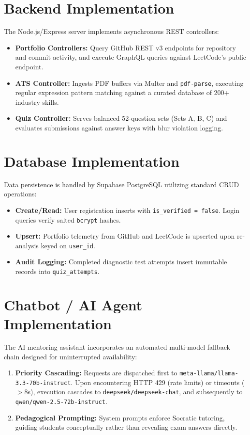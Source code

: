 \documentclass[12pt,a4paper]{report}
\begin{document}
\section{Backend Implementation}
The Node.js/Express server implements asynchronous REST controllers:
\begin{itemize}
    \item \textbf{Portfolio Controllers:} Query GitHub REST v3 endpoints for repository and commit activity, and execute GraphQL queries against LeetCode's public endpoint.
    \item \textbf{ATS Controller:} Ingests PDF buffers via Multer and \texttt{pdf-parse}, executing regular expression pattern matching against a curated database of 200+ industry skills.
    \item \textbf{Quiz Controller:} Serves balanced 52-question sets (Sets A, B, C) and evaluates submissions against answer keys with blur violation logging.
\end{itemize}

\section{Database Implementation}
Data persistence is handled by Supabase PostgreSQL utilizing standard CRUD operations:
\begin{itemize}
    \item \textbf{Create/Read:} User registration inserts with \texttt{is\_verified = false}. Login queries verify salted \texttt{bcrypt} hashes.
    \item \textbf{Upsert:} Portfolio telemetry from GitHub and LeetCode is upserted upon re-analysis keyed on \texttt{user\_id}.
    \item \textbf{Audit Logging:} Completed diagnostic test attempts insert immutable records into \texttt{quiz\_attempts}.
\end{itemize}

\section{Chatbot / AI Agent Implementation}
The AI mentoring assistant incorporates an automated multi-model fallback chain designed for uninterrupted availability:
\begin{enumerate}
    \item \textbf{Priority Cascading:} Requests are dispatched first to \texttt{meta-llama/llama-3.3-70b-instruct}. Upon encountering HTTP 429 (rate limits) or timeouts ($>8$s), execution cascades to \texttt{deepseek/deepseek-chat}, and subsequently to \texttt{qwen/qwen-2.5-72b-instruct}.
    \item \textbf{Pedagogical Prompting:} System prompts enforce Socratic tutoring, guiding students conceptually rather than revealing exam answers directly.
\end{enumerate}
\end{document}
